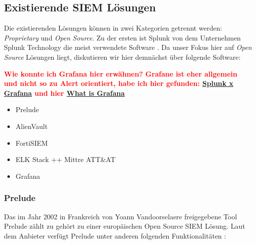 \subsection{Existierende SIEM Lösungen}
Die existierenden  Lösungen können in zwei Kategorien getrennt werden: \textit{\gls{Proprietary}} und \textit{\gls{Open Source}}. Zu der ersten ist Splunk von dem Unternehmen Splunk Technology die meist verwendete Software \citep{Kazarov_Splunk}. Da unser Fokus hier auf \textit{\gls{Open Source}} Lösungen liegt, diskutieren wir hier demnächst über folgende Software:

\textbf{\textcolor{red}{Wie konnte ich Grafana hier erwähnen? Grafane ist eher allgemein und nicht so zu Alert orientiert, habe ich hier gefunden: \href{https://www.metricfire.com/blog/grafana-vs-splunk/}{Splunk x Grafana} und hier \href{https://www.researchgate.net/publication/350730340_Implementation_of_Grafana_as_open_source_visualization_and_query_processing_platform_for_data_scientists_and_researchers}{What is Grafana}}  }

\begin{itemize}[noitemsep]
   \item Prelude
   \item AlienVault 
   \item FortiSIEM
   \item ELK Stack ++ Mittre ATT&AT %
   \item Grafana  %
\end{itemize}





\subsubsection{Prelude}

Das im Jahr 2002 in Frankreich von Yoann Vandoorselaere freigegebene Tool Prelude zählt zu gehört zu einer europäischen \gls{Open Source} \gls{SIEM} Lösung. Laut dem Anbieter verfügt Prelude unter anderen folgenden Funktionalitäten \citep{Prelude_SIEM}:

